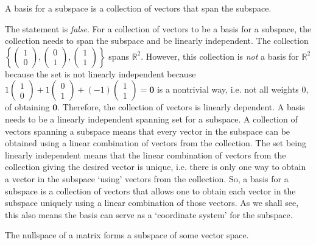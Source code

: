 \documentclass[11pt,letterpaper]{article}
\begin{document}
 A basis for a subspace is a collection of vectors that span the subspace. \pspace

\sol The statement is \textit{false}. For a collection of vectors to be a basis for a subspace, the collection needs to span the subspace and be linearly independent. The collection $\left\{ \begin{pmatrix} 1 \\ 0 \end{pmatrix}, \begin{pmatrix} 0 \\ 1 \end{pmatrix}, \begin{pmatrix} 1 \\ 1 \end{pmatrix} \right\}$ spans $\mathbb{R}^2$. However, this collection is \textit{not} a basis for $\mathbb{R}^2$ because the set is not linearly independent because $1 \begin{pmatrix} 1 \\ 0 \end{pmatrix} + 1 \begin{pmatrix} 0 \\ 1 \end{pmatrix} + (-1) \begin{pmatrix} 1 \\ 1 \end{pmatrix}= \mathbf{0}$ is a nontrivial way, i.e. not all weights 0, of obtaining $\mathbf{0}$. Therefore, the collection of vectors is linearly dependent. A basis needs to be a linearly independent spanning set for a subspace. A collection of vectors spanning a subspace means that every vector in the subspace can be obtained using a linear combination of vectors from the collection. The set being linearly independent means that the linear combination of vectors from the collection giving the desired vector is unique, i.e. there is only one way to obtain a vector in the subspace `using' vectors from the collection. So, a basis for a subspace is a collection of vectors that allows one to obtain each vector in the subspace uniquely using a linear combination of those vectors. As we shall see, this also means the basis can serve as a `coordinate system' for the subspace. \pvspace{1.3cm}



 The nullspace of a matrix forms a subspace of some vector space. \pspace
\end{document}
